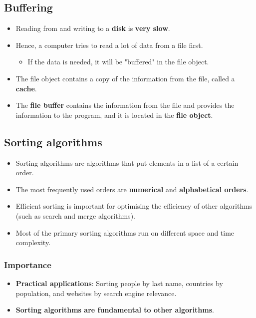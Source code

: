 \documentclass[11pt]{article}
\begin{document}
\subsection{Buffering}
\label{sec:org922b093}
\begin{itemize}
\item Reading from and writing to a \textbf{disk} is \textbf{very slow}.
\item Hence, a computer tries to read a lot of data from a file first.
\begin{itemize}
\item If the data is needed, it will be "buffered" in the file object.
\end{itemize}
\item The file object contains a copy of the information from the file, called a \textbf{cache}.
\item The \textbf{file buffer} contains the information from the file and provides the information to the program, and it is located in the \textbf{file object}.
\end{itemize}

\subsection{Sorting algorithms}
\label{sec:org7f14486}
\begin{itemize}
\item Sorting algorithms are algorithms that put elements in a list of a certain order.
\item The most frequently used orders are \textbf{numerical} and \textbf{alphabetical orders}.
\item Efficient sorting is important for optimising the efficiency of other algorithms (such as search and merge algorithms).
\item Most of the primary sorting algorithms run on different space and time complexity.
\end{itemize}

\subsubsection{Importance}
\label{sec:org1e42cc1}
\begin{itemize}
\item \textbf{Practical applications}: Sorting people by last name, countries by population, and websites by search engine relevance.
\item \textbf{Sorting algorithms are fundamental to other algorithms}.
\end{itemize}
\end{document}
